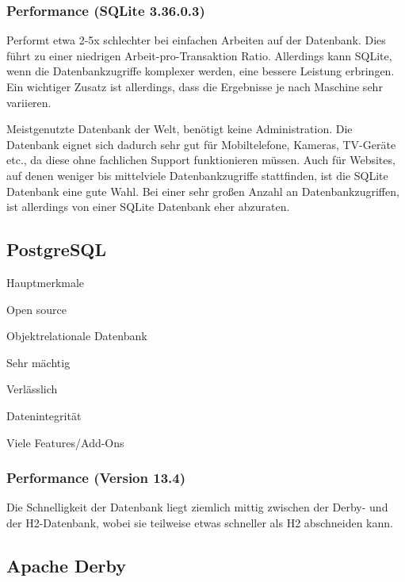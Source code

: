\subsubsection{Performance (SQLite 3.36.0.3)}
Performt etwa 2-5x schlechter bei einfachen Arbeiten auf der Datenbank. Dies führt zu einer niedrigen Arbeit-pro-Transaktion Ratio. Allerdings kann SQLite, wenn die Datenbankzugriffe komplexer werden, eine bessere Leistung erbringen. Ein wichtiger Zusatz ist allerdings, dass die Ergebnisse je nach Maschine sehr variieren. \cite{databaseComparison}

Meistgenutzte Datenbank der Welt, benötigt keine Administration. Die Datenbank eignet sich dadurch sehr gut für Mobiltelefone, Kameras, TV-Geräte etc., da diese ohne fachlichen Support funktionieren müssen. Auch für Websites, auf denen weniger bis mittelviele Datenbankzugriffe stattfinden, ist die SQLite Datenbank eine gute Wahl. Bei einer sehr großen Anzahl an Datenbankzugriffen, ist allerdings von einer SQLite Datenbank eher abzuraten. \cite{databaseComparison}

\subsection{PostgreSQL}
 
\begin{compactitem}
    \item[Hauptmerkmale]
    \item Open source
    \item Objektrelationale Datenbank        
    \item Sehr mächtig
    \item Verlässlich
    \item Datenintegrität
    \item Viele Features/Add-Ons
\end{compactitem}
\cite{PostgreSQLOfficialSite}

\subsubsection{Performance (Version 13.4)}
Die Schnelligkeit der Datenbank liegt ziemlich mittig zwischen der Derby- und der H2-Datenbank, wobei sie teilweise etwas schneller als H2 abschneiden kann. \cite{databaseComparison}

 
\subsection{Apache Derby}


